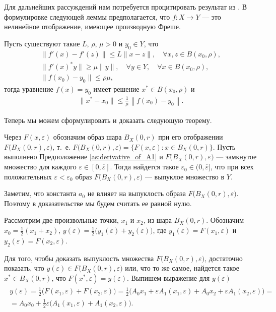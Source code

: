 \documentclass[../main.tex]{subfiles}
\begin{document}
Для дальнейших рассуждений нам потребуется процитировать результат из \cite{Polyak2001, Polyak1964}. 
В формулировке следующей леммы предполагается, что $f:X \to Y$ --- это нелинейное отображение, имеющее производную Фреше.
\begin{lemma}\label{lem:Polyak_lemma}
 Пусть существуют такие $L$, $\rho$, $\mu > 0$ и $y_0 \in Y$, что 
 \begin{gather*}
 \| f'(x) - f'(z) \| \leqslant L \| x - z\|, \quad \forall x,z \in B(x_0,\rho), \\
 \| f'(x)^*y \| \geqslant \mu \|y \|, \quad \forall y \in Y, \quad \forall x \in B(x_0, \rho), \\
 \| f(x_0) - y_0 \| \leqslant \rho \mu,
 \end{gather*}
 тогда уравнение $f(x) = y_0$ имеет решение $x^* \in B(x_0,\rho)$ и 
 \begin{gather*}
 \|x^* - x_0\| \leqslant \frac{1}{\mu} \left\| f(x_0) - y_0 \right\|.
 \end{gather*}
\end{lemma}
Теперь мы можем сформулировать и доказать следующую теорему.
\begin{theorem}\label{th:ImageConvexity}
 Через $F(x,\varepsilon)$ обозначим образ шара $B_X(0, r)$ при его отображении $F\big(B_X(0,r),\varepsilon\big)$, т.~е. $F\big(B_X(0,r),\varepsilon\big) = \big\{F(x,\varepsilon): x\in B_X(0, r)\big\}$.
 Пусть выполнено Предположение \ref{as:derivative_of_A1} и $F\big(B_X(0,r),\varepsilon\big)$ --- замкнутое множество для каждого $\varepsilon \in [0, \overline{\varepsilon}]$. 
Тогда найдется такое $ \varepsilon_0 \in (0, \overline{\varepsilon}]$, что при всех положительных $\varepsilon < \varepsilon_0$ образ $F\big(B_X(0,r),\varepsilon\big)$ --- выпуклое множество в $Y$. 
\end{theorem}
\doc
Заметим, что константа $a_0$ не влияет на выпуклость образа $F\big(B_X(0,r),\varepsilon\big)$. 
Поэтому в доказательстве мы будем считать ее равной нулю.

Рассмотрим две произвольные точки, $x_1$ и $x_2$, из шара $B_X(0,r)$. 
Обозначим $x_0 = \frac{1}{2}(x_1 + x_2)$, $y(\varepsilon) = \frac{1}{2}\big(y_1(\varepsilon) + y_2(\varepsilon)\big)$, где $y_1(\varepsilon) = F(x_1, \varepsilon)$ и $y_2(\varepsilon) = F(x_2, \varepsilon)$. 

Для того, чтобы доказать выпуклость множества $F\big(B_X(0,r),\varepsilon\big)$, достаточно показать, что $y(\varepsilon) \in F\big(B_X(0,r),\varepsilon\big)$ или, что то же самое, найдется такое $x^* \in B_X(0,r) $, что $F(x^*, \varepsilon) = y(\varepsilon) $.
Выпишем выражение для $y(\varepsilon)$
\begin{gather}\label{y}
 \begin{gathered}
 y(\varepsilon)=
 \frac{1}{2} \big(
 F(x_1,\varepsilon)+ 
 F(x_2,\varepsilon)
 \big) = 
 \frac{1}{2} \big(
 A_0 x_1 +
 \varepsilon A_1(x_1,\varepsilon) +
 A_0 x_2 +
 \varepsilon A_1(x_2,\varepsilon) 
 \big) = \\ = A_0 x_0 + 
 \frac{1}{2} \varepsilon \big( 
 A_1(x_1,\varepsilon)+ 
 A_1(x_2,\varepsilon)
 \big).
 \end{gathered}
\end{gather}
\end{document}
